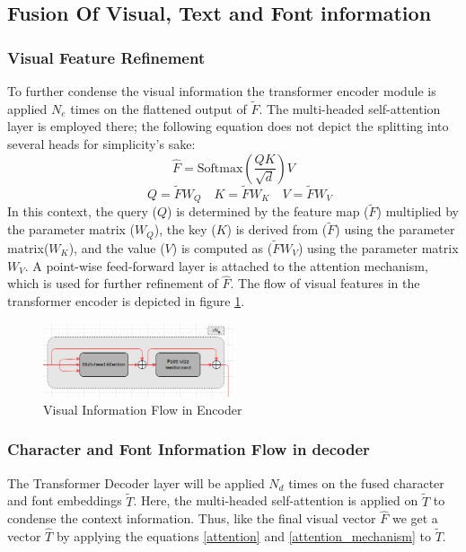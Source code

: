\documentclass[conference]{IEEEtran}
\begin{document}
\subsection{Fusion Of Visual, Text and Font information}\label{combinded_feat}
\subsubsection{Visual Feature Refinement}\label{Visual_refine}
To further condense the visual information the transformer encoder module is applied \(N_e\) times on the flattened output of \(\tilde{F}\). The multi-headed self-attention layer \cite{vaswani2017attention} is employed there; the following equation does not depict the splitting into several heads for simplicity's sake:
\begin{equation}\label{attention}
\hat{F} = \text{Softmax}\left(\frac{QK}{\sqrt{d}}\right) V \tag{7}
\end{equation}
\begin{equation}\label{attention_mechanism}
\quad Q = \tilde{F}W_Q \quad K = \tilde{F}W_K \quad V = \tilde{F}W_V \tag{8}
\end{equation}
In this context, the query (\(Q\)) is determined by the feature map (\(\tilde{F}\)) multiplied by the parameter matrix (\(W_Q\)), the key (\(K\)) is derived from (\(\tilde{F}\)) using the parameter matrix(\(W_K\)), and the value (\(V\)) is computed as (\(\tilde{F}W_V\)) using the parameter matrix  \( W_V \). A point-wise feed-forward layer is
attached to the attention mechanism, which is used for further refinement of \(\hat{F}\). The flow of visual features in the transformer encoder is depicted in figure \ref{encoder}.

\begin{figure}[htbp]
    \centering
    \includegraphics[width=0.5\textwidth]{figures/Encoder.png}
    \caption{Visual Information Flow in Encoder}
    \label{encoder}
\end{figure}

\subsubsection{Character and Font Information Flow in decoder}\label{Character_and_font}
The Transformer Decoder layer will be applied \(N_d\) times on the fused character and font embeddings \(\tilde{T}\). Here, the multi-headed self-attention is applied on \(\tilde{T}\) to condense the context information. Thus, like the final visual vector \(\hat{F}\) we get a vector \(\hat{T}\) by applying the equations \ref{attention} and \ref{attention_mechanism} to  \(\tilde{T}\).
\end{document}
